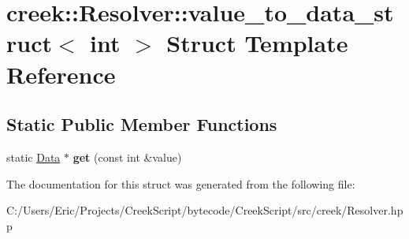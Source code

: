 \hypertarget{structcreek_1_1_resolver_1_1value__to__data__struct_3_01int_01_4}{}\section{creek\+:\+:Resolver\+:\+:value\+\_\+to\+\_\+data\+\_\+struct$<$ int $>$ Struct Template Reference}
\label{structcreek_1_1_resolver_1_1value__to__data__struct_3_01int_01_4}
\subsection*{Static Public Member Functions}
\begin{DoxyCompactItemize}
\item 
static \hyperlink{classcreek_1_1_data}{Data} $\ast$ {\bfseries get} (const int \&value)\hypertarget{structcreek_1_1_resolver_1_1value__to__data__struct_3_01int_01_4_ade85a66beb1e95d3031c4d0a1dda4594}{}\label{structcreek_1_1_resolver_1_1value__to__data__struct_3_01int_01_4_ade85a66beb1e95d3031c4d0a1dda4594}

\end{DoxyCompactItemize}


The documentation for this struct was generated from the following file\+:\begin{DoxyCompactItemize}
\item 
C\+:/\+Users/\+Eric/\+Projects/\+Creek\+Script/bytecode/\+Creek\+Script/src/creek/Resolver.\+hpp\end{DoxyCompactItemize}
